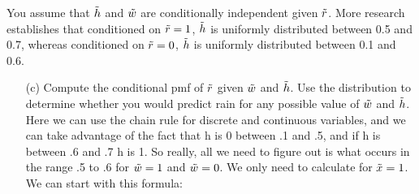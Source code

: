 \documentclass[12pt,twoside]{article}
\newcommand{\rnd}{\Tilde}
\begin{document}
\begin{enumerate}
\begin{enumerate}
\end{enumerate}
You assume that $\rnd{h}$ and $\rnd{w}$ are conditionally independent given $\rnd{r}$. More research establishes that conditioned on $\rnd{r}=1$, $\rnd{h}$ is uniformly distributed between 0.5 and 0.7, whereas conditioned on $\rnd{r}=0$, $\rnd{h}$ is uniformly distributed between 0.1 and 0.6.  \begin{enumerate}
 \item[(c)] Compute the conditional pmf of $\rnd{r}$ given $\rnd{w}$ and $\rnd{h}$. Use the distribution to determine whether you would predict rain for any possible value of $\rnd{w}$ and $\rnd{h}$.
 \subitem
 Here we can use the chain rule for discrete and continuous variables, and we can take advantage of the fact that h is 0 between .1 and .5, and if h is between .6 and .7 h is 1. So really, all we need to figure out is what occurs in the range .5 to .6 for $\rnd{w}=1$ and $\rnd{w}=0$. We only need to calculate for $\rnd{x}=1$. We can start with this formula:
 

\end{enumerate}
\end{enumerate}
\end{document}
